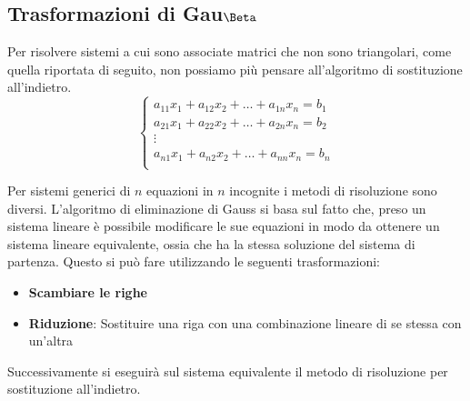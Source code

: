 \subsection{Trasformazioni di Gau$\Beta$}
Per risolvere sistemi a cui sono associate matrici che non sono triangolari,
come quella riportata di seguito, non possiamo più pensare all'algoritmo di
sostituzione all'indietro.
\begin{equation}
    \begin{cases}
        a_{11}x_1 + a_{12} x_2 + \dots + a_{1n} x_n= b_1 \\
        a_{21}x_1 + a_{22} x_2 + \dots + a_{2n} x_n= b_2 \\
        \vdots                                           \\
        a_{n1}x_1 + a_{n2} x_2 + \dots + a_{nn} x_n= b_n \\
    \end{cases}
\end{equation}

Per sistemi generici di $n$ equazioni in $n$ incognite i metodi di risoluzione
sono diversi. L'algoritmo di eliminazione di Gauss si basa sul fatto che, preso
un sistema lineare è possibile modificare le sue equazioni in modo da ottenere
un sistema lineare equivalente, ossia che ha la stessa soluzione del sistema di
partenza. Questo si può fare utilizzando le seguenti trasformazioni:
\begin{itemize}
    \item \textbf{Scambiare le righe}
    \item \textbf{Riduzione}: Sostituire una riga con una combinazione lineare di
          se stessa con un'altra
\end{itemize}
Successivamente si eseguirà sul sistema equivalente il metodo di risoluzione per
sostituzione all'indietro.

